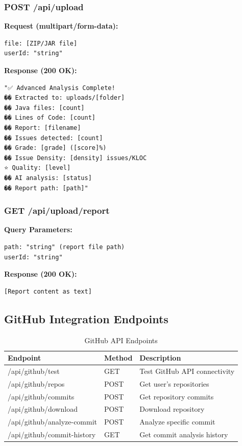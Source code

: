 \documentclass[12pt,a4paper]{article}
\begin{document}
    \subsubsection{POST /api/upload}

    \textbf{Request (multipart/form-data):}
    \begin{verbatim}
file: [ZIP/JAR file]
userId: "string"
    \end{verbatim}

    \textbf{Response (200 OK):}
    \begin{verbatim}
"✅ Advanced Analysis Complete!
�� Extracted to: uploads/[folder]
�� Java files: [count]
�� Lines of Code: [count]
�� Report: [filename]
�� Issues detected: [count]
�� Grade: [grade] ([score]%)
�� Issue Density: [density] issues/KLOC
⭐ Quality: [level]
�� AI analysis: [status]
�� Report path: [path]"
    \end{verbatim}

    \subsubsection{GET /api/upload/report}

    \textbf{Query Parameters:}
    \begin{verbatim}
path: "string" (report file path)
userId: "string"
    \end{verbatim}

    \textbf{Response (200 OK):}
    \begin{verbatim}
[Report content as text]
    \end{verbatim}

    \subsection{GitHub Integration Endpoints}

    \begin{table}[H]
        \caption{GitHub API Endpoints}
        \begin{tabular}{|l|l|p{5cm}|}
            \hline
            \textbf{Endpoint} & \textbf{Method} & \textbf{Description} \\
            \hline
            /api/github/test & GET & Test GitHub API connectivity \\
            \hline
            /api/github/repos & POST & Get user's repositories \\
            \hline
            /api/github/commits & POST & Get repository commits \\
            \hline
            /api/github/download & POST & Download repository \\
            \hline
            /api/github/analyze-commit & POST & Analyze specific commit \\
            \hline
            /api/github/commit-history & GET & Get commit analysis history \\
            \hline
        \end{tabular}
    \end{table}
\end{document}
